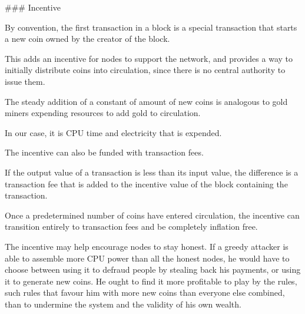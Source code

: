 ### Incentive

By convention, the first transaction in a block is a special transaction that starts a new coin owned by the creator of the block.

This adds an incentive for nodes to support the network, and provides a way to initially distribute coins into circulation, since there is no central authority to issue them.

The steady addition of a constant of amount of new coins is analogous to gold miners expending resources to add gold to circulation.

In our case, it is CPU time and electricity that is expended.

The incentive can also be funded with transaction fees.

If the output value of a transaction is less than its input value, the difference is a transaction fee that is added to the incentive value of the block containing the transaction.

Once a predetermined number of coins have entered circulation, the incentive can transition entirely to transaction fees and be completely inflation free.

The incentive may help encourage nodes to stay honest. If a greedy attacker is able to assemble more CPU power than all the honest nodes, he would have to choose between using it to defraud people by stealing back his payments, or using it to generate new coins. He ought to find it more profitable to play by the rules, such rules that favour him with more new coins than everyone else combined, than to undermine the system and the validity of his own wealth.